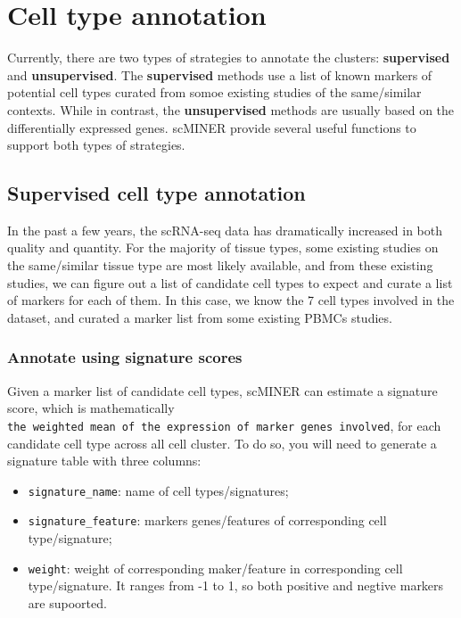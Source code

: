 \documentclass[
  12pt,
]{book}
\providecommand{\tightlist}{%
  \setlength{\itemsep}{0pt}\setlength{\parskip}{0pt}}
\begin{document}
\chapter{Cell type annotation}\label{cell-type-annotation}

Currently, there are two types of strategies to annotate the clusters: \textbf{supervised} and \textbf{unsupervised}. The \textbf{supervised} methods use a list of known markers of potential cell types curated from somoe existing studies of the same/similar contexts. While in contrast, the \textbf{unsupervised} methods are usually based on the differentially expressed genes. scMINER provide several useful functions to support both types of strategies.

\section{Supervised cell type annotation}\label{supervised-cell-type-annotation}

In the past a few years, the scRNA-seq data has dramatically increased in both quality and quantity. For the majority of tissue types, some existing studies on the same/similar tissue type are most likely available, and from these existing studies, we can figure out a list of candidate cell types to expect and curate a list of markers for each of them. In this case, we know the 7 cell types involved in the dataset, and curated a marker list from some existing PBMCs studies.

\subsection{Annotate using signature scores}\label{annotate-using-signature-scores}

Given a marker list of candidate cell types, scMINER can estimate a signature score, which is mathematically \texttt{the\ weighted\ mean\ of\ the\ expression\ of\ marker\ genes\ involved}, for each candidate cell type across all cell cluster. To do so, you will need to generate a signature table with three columns:

\begin{itemize}
\tightlist
\item
  \texttt{signature\_name}: name of cell types/signatures;
\item
  \texttt{signature\_feature}: markers genes/features of corresponding cell type/signature;
\item
  \texttt{weight}: weight of corresponding maker/feature in corresponding cell type/signature. It ranges from -1 to 1, so both positive and negtive markers are supoorted.
\end{itemize}
\end{document}
